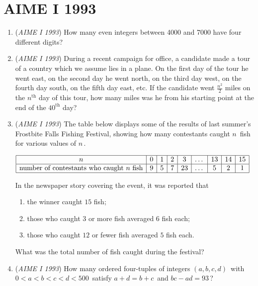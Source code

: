 \section{AIME I 1993}
        \begin{enumerate}
        	\item (\textit{AIME I 1993}) How many even integers between 4000 and 7000 have four different digits? 


 

	\item (\textit{AIME I 1993}) During a recent campaign for office, a candidate made a tour of a country which we assume lies in a plane. On the first day of the tour he went east, on the second day he went north, on the third day west, on the fourth day south, on the fifth day east, etc. If the candidate went $\frac{n^{2}}{2}$ miles on the $n^{\mbox{th}}_{}$ day of this tour, how many miles was he from his starting point at the end of the $40^{\mbox{th}}_{}$ day? 


 

	\item (\textit{AIME I 1993}) The table below displays some of the results of last summer's Frostbite Falls Fishing Festival, showing how many contestants caught $n\,$ fish for various values of $n\,$. 


 $\begin{array}{|c|c|c|c|c|c|c|c|c|} \hline n & 0 & 1 & 2 & 3 & \dots & 13 & 14 & 15 \\ \hline \text{number of contestants who caught} \ n \ \text{fish} & 9 & 5 & 7 & 23 & \dots & 5 & 2 & 1 \\ \hline \end{array}$

 In the newspaper story covering the event, it was reported that 


 
            \begin{enumerate}[label=(\roman*)]
                \item  the winner caught $15$ fish;
\item  those who caught $3$ or more fish averaged $6$ fish each;
\item  those who caught $12$ or fewer fish averaged $5$ fish each.
            \end{enumerate}
            What was the total number of fish caught during the festival?


 

	\item (\textit{AIME I 1993}) How many ordered four-tuples of integers $(a,b,c,d)\,$ with $0 < a < b < c < d < 500\,$ satisfy $a + d = b + c\,$ and $bc - ad = 93\,$?



\end{enumerate}
